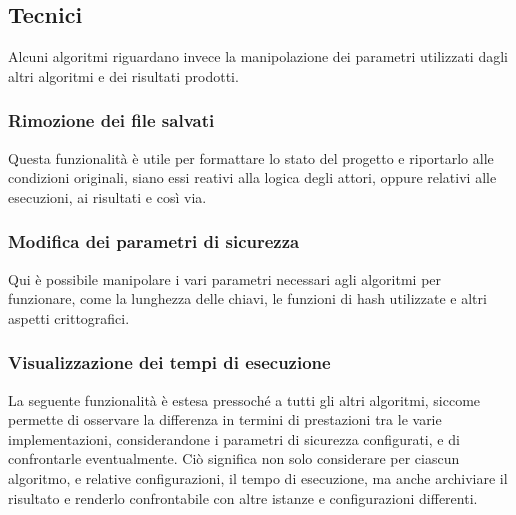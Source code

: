 \documentclass[a4paper,12pt]{article}
\begin{document}
\subsection{Tecnici}
Alcuni algoritmi riguardano invece la manipolazione dei parametri utilizzati dagli altri algoritmi e dei risultati prodotti.
\subsubsection{Rimozione dei file salvati}
Questa funzionalità è utile per formattare lo stato del progetto e riportarlo alle condizioni originali, siano essi reativi alla logica degli attori, oppure relativi alle esecuzioni, ai risultati e così via.
\subsubsection{Modifica dei parametri di sicurezza}
Qui è possibile manipolare i vari parametri necessari agli algoritmi per funzionare, come la lunghezza delle chiavi, le funzioni di hash utilizzate e altri aspetti crittografici.
\subsubsection{Visualizzazione dei tempi di esecuzione}
La seguente funzionalità è estesa pressoché a tutti gli altri algoritmi, siccome permette di osservare la differenza in termini di prestazioni tra le varie implementazioni, considerandone i parametri di sicurezza configurati, e di confrontarle eventualmente. Ciò significa non solo considerare per ciascun algoritmo, e relative configurazioni, il tempo di esecuzione, ma anche archiviare il risultato e renderlo confrontabile con altre istanze e configurazioni differenti.
\end{document}
